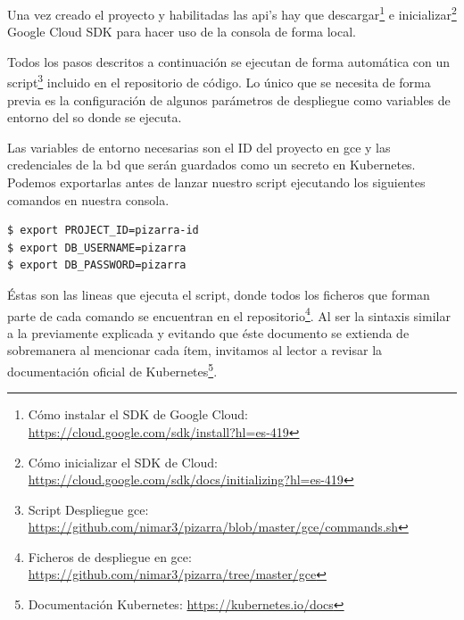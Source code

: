 \documentclass[11pt,spanish,listoffigures,listoftables]{tfgetsinf}
\begin{document}
Una vez creado el proyecto y habilitadas las \acrshort{api}'s hay que descargar\footnote{Cómo instalar el SDK de Google Cloud: \url{https://cloud.google.com/sdk/install?hl=es-419}} e inicializar\footnote{Cómo inicializar el SDK de Cloud:  \url{https://cloud.google.com/sdk/docs/initializing?hl=es-419}} Google Cloud SDK para hacer uso de la consola de forma local. 

Todos los pasos descritos a continuación se ejecutan de forma automática con un script\footnote{Script Despliegue \acrshort{gce}: \url{https://github.com/nimar3/pizarra/blob/master/gce/commands.sh}} incluido en el repositorio de código. Lo único que se necesita de forma previa es la configuración de algunos parámetros de despliegue como variables de entorno del \acrshort{so} donde se ejecuta.

Las variables de entorno necesarias son el ID del proyecto en \acrshort{gce} y las credenciales de la \acrshort{bd} que serán guardados como un secreto en Kubernetes. Podemos exportarlas antes de lanzar nuestro script ejecutando los siguientes comandos en nuestra consola.

\begin{lstlisting}[language=bash]
$ export PROJECT_ID=pizarra-id
$ export DB_USERNAME=pizarra
$ export DB_PASSWORD=pizarra
\end{lstlisting}

Éstas son las lineas que ejecuta el script, donde todos los ficheros que forman parte de cada comando se encuentran en el repositorio\footnote{Ficheros de despliegue en \acrshort{gce}: \url{https://github.com/nimar3/pizarra/tree/master/gce}}. Al ser la sintaxis similar a la previamente explicada y evitando que éste documento se extienda de sobremanera al mencionar cada ítem, invitamos al lector a revisar la documentación oficial de Kubernetes\footnote{Documentación Kubernetes: \url{https://kubernetes.io/docs}}.
\end{document}
